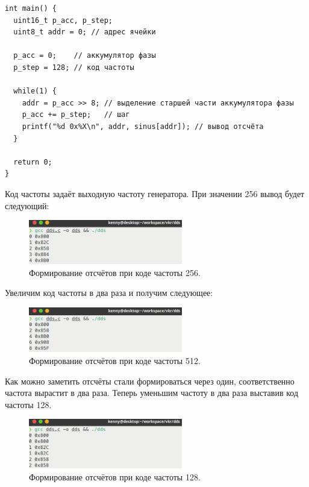 \begin{code}
\begin{verbatim}
int main() {
  uint16_t p_acc, p_step;
  uint8_t addr = 0; // адрес ячейки

  p_acc = 0;    // аккумулятор фазы
  p_step = 128; // код частоты

  while(1) {
    addr = p_acc >> 8; // выделение старшей части аккумулятора фазы
    p_acc += p_step;   // шаг
    printf("%d 0x%X\n", addr, sinus[addr]); // вывод отсчёта
  }

  return 0;
}
\end{verbatim}
\end{code}

	
	Код частоты задаёт выходную частоту генератора. При значении 256 вывод будет следующий:
	
\begin{figure}[H]
    \centering
    \includegraphics[width=0.6\textwidth]{../image/dds256.png}
    \caption{Формирование отсчётов при коде частоты 256.}
\end{figure}
	
	Увеличим код частоты в два раза и получим следующее:

\begin{figure}[H]
    \centering
    \includegraphics[width=0.6\textwidth]{../image/dds512.png}
    \caption{Формирование отсчётов при коде частоты 512.}
\end{figure}

	Как можно заметить отсчёты стали формироваться через один, соответственно частота вырастит в два раза. Теперь уменьшим частоту в два раза выставив код частоты 128.

\begin{figure}[H]
    \centering
    \includegraphics[width=0.6\textwidth]{../image/dds128.png}
    \caption{Формирование отсчётов при коде частоты 128.}
\end{figure}

